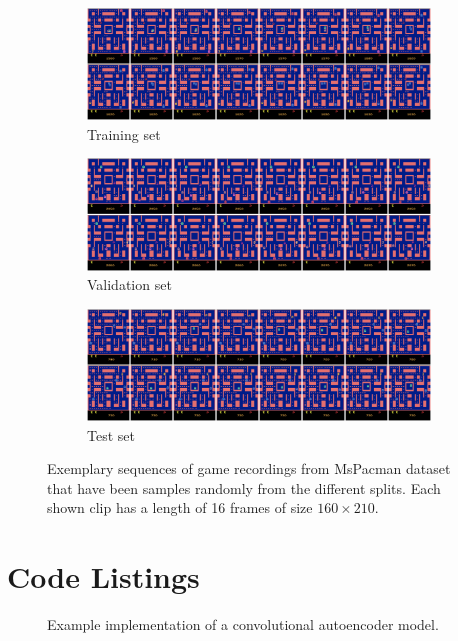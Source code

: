 \begin{figure}[h!tb]
\centering
\begin{subfigure}{1.0\textwidth}
  \centering
  \includegraphics[width=1.0\linewidth]{figures/ds/pac_train_full.png}
  \caption{Training set}
  \label{fig:pac_train_full}
  \vspace{.1cm}
\end{subfigure}
\begin{subfigure}{1.0\textwidth}
  \centering
  \includegraphics[width=1.0\linewidth]{figures/ds/pac_valid_full.png}
  \caption{Validation set}
  \label{fig:pac_valid_full}
  \vspace{.1cm}
\end{subfigure}
\begin{subfigure}{1.0\textwidth}
  \centering
  \includegraphics[width=1.0\linewidth]{figures/ds/pac_test_full.png}
  \caption{Test set}
  \label{fig:pac_test_full}
\end{subfigure}
\caption[MsPacman Full Image Samples]{Exemplary sequences of game recordings from MsPacman dataset that have been samples randomly from the different splits. Each shown clip has a length of \num{16} frames of size $160 \times 210$.}
\label{fig:pacman_full}
\end{figure}



\clearpage
\section{Code Listings}

\begin{figure}[h!tb]
  
  \caption[Code: Convolutional Autoencoder]{Example implementation of a convolutional autoencoder model.}\label{code:model}
\end{figure}

